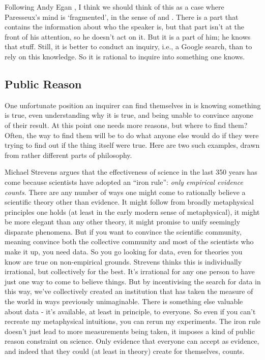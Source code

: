 \documentclass[
  11pt,
]{book}
\begin{document}
Following Andy Egan \citeyearpar{Egan2008}, I think we should think of this as a case where Paresseux's mind is `fragmented', in the sense of \citet{Lewis1982c} and \citet{Stalnaker1984}. There is a part that contains the information about who the speaker is, but that part isn't at the front of his attention, so he doesn't act on it. But it is a part of him; he knows that stuff. Still, it is better to conduct an inquiry, i.e., a Google search, than to rely on this knowledge. So it is rational to inquire into something one knows.

\hypertarget{rawlsinquiry}{%
\subsection{Public Reason}\label{rawlsinquiry}}

One unfortunate position an inquirer can find themselves in is knowing something is true, even understanding why it is true, and being unable to convince anyone of their result. At this point one needs more reasons, but where to find them? Often, the way to find them will be to do what anyone else would do if they were trying to find out if the thing itself were true. Here are two such examples, drawn from rather different parts of philosophy.

Michael Strevens \citeyearpar{Strevens2020} argues that the effectiveness of science in the last 350 years has come because scientists have adopted an ``iron rule'': \emph{only empirical evidence counts}. There are any number of ways one might come to rationally believe a scientific theory other than evidence. It might follow from broadly metaphysical principles one holds (at least in the early modern sense of metaphysical), it might be more elegant than any other theory, it might promise to unify seemingly disparate phenomena. But if you want to convince the scientific community, meaning convince both the collective community and most of the scientists who make it up, you need data. So you go looking for data, even for theories you know are true on non-empirical grounds. Strevens thinks this is individually irrational, but collectively for the best. It's irrational for any one person to have just one way to come to believe things. But by incentivising the search for data in this way, we've collectively created an institution that has taken the measure of the world in ways previously unimaginable. There is something else valuable about data - it's available, at least in principle, to everyone. So even if you can't recreate my metaphysical intuitions, you can rerun my experiments. The iron rule doesn't just lead to more measurements being taken, it imposes a kind of public reason constraint on science. Only evidence that everyone can accept as evidence, and indeed that they could (at least in theory) create for themselves, counts.
\end{document}
